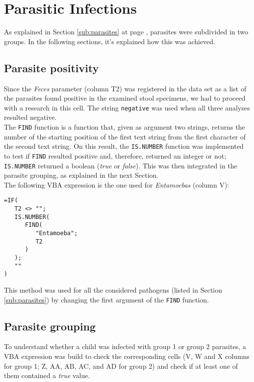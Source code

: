 \section{Parasitic Infections}\label{asec:parasiticinfections}
As explained in Section \ref{sub:parasites} at page \pageref{sub:parasites}, parasites were subdivided in two groups. In the following sections, it's explained how this was achieved.

\subsection{Parasite positivity}\label{asub:parasitespos}
Since the \textit{Feces} parameter (column T2) was registered in the data set as a list of the parasites found positive in the examined stool specimens, we had to proceed with a research in this cell. The string \texttt{negative} was used when all three analyses resulted negative.\\
The \texttt{FIND} function is a function that, given as argument two strings, returns the number of the starting position of the first text string from the first character of the second text string. On this result, the \texttt{IS.NUMBER} function was implemented to test if \texttt{FIND} resulted positive and, therefore, returned an integer or not; \texttt{IS.NUMBER} returned a boolean (\textit{true} or \textit{false}). This was then integrated in the parasite grouping, as explained in the next Section.\\
The following VBA expression is the one used for \textit{Entamoebas} (column V):

\begin{lstlisting}
=IF(
   T2 <> "";
   IS.NUMBER(
      FIND(
         "Entamoeba";
         T2
      )
   );
   ""
)
\end{lstlisting}

This method was used for all the considered pathogens (listed in Section \ref{sub:parasites}) by changing the first argument of the \texttt{FIND} function.

\subsection{Parasite grouping}\label{asub:parasitegrouping}
To understand whether a child was infected with group 1 or group 2 parasites, a VBA expression was build to check the corresponding cells (V, W and X columns for group 1; Z, AA, AB, AC, and AD for group 2) and check if at least one of them contained a \textit{true} value.

